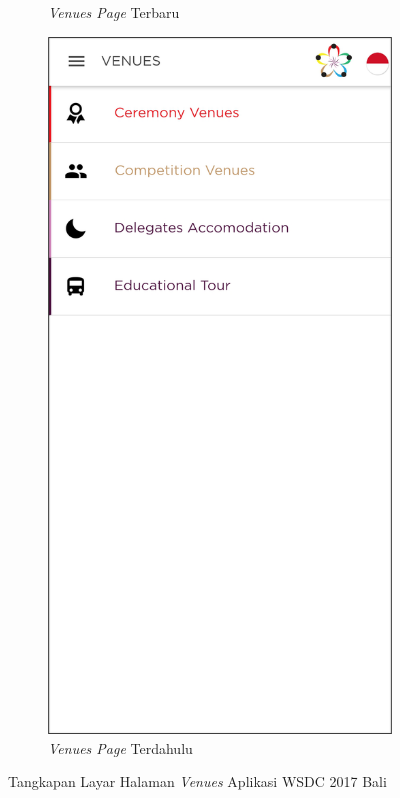 \begin{figure}[H]
\begin{subfigure}[b]{0.3\textwidth}
         \caption{\textit{Venues Page} Terbaru}
         \label{fig:ssVenue}
     \end{subfigure}
     \hspace*{0.5in}
     \begin{subfigure}[b]{0.3\textwidth}
         \centering
         \includegraphics[width=\textwidth]{Gambar/VenuePage.png}
         \caption{\textit{Venues Page} Terdahulu}
         \label{fig:ssVenueOld}
     \end{subfigure}
        \caption{Tangkapan Layar Halaman \textit{Venues} Aplikasi WSDC 2017 Bali}
        \label{fig:ssApk1}
\end{figure}

